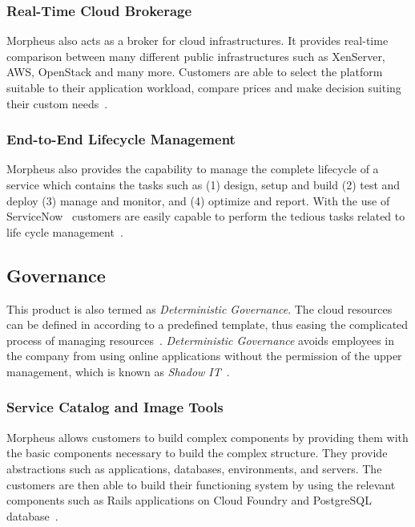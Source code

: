 \subsubsection{Real-Time Cloud Brokerage}

Morpheus also acts as a broker for cloud infrastructures. It provides real-time 
comparison between many different public infrastructures such as XenServer, 
AWS, OpenStack and many more. Customers are able to select the platform 
suitable to their application workload, compare prices and make decision 
suiting their custom needs~\cite{hid-sp18-416-www-morpheus-analytics}. 

\subsubsection{End-to-End Lifecycle Management}

Morpheus also provides the capability to manage the complete lifecycle of a 
service which contains the tasks such as (1) design, setup and build (2) test 
and deploy (3) manage and monitor, and (4) optimize and report. With the use of 
ServiceNow~\cite{hid-sp18-416-www-servicenow} customers are easily capable to 
perform the tedious tasks related to life cycle 
management~\cite{hid-sp18-416-www-morpheus-analytics}.

\subsection{Governance}

This product is also termed as \textit{Deterministic Governance}. The cloud 
resources can be defined in according to a predefined template, thus easing the 
complicated process of managing 
resources~\cite{hid-sp18-416-www-morpheus-product-guide}. \textit{Deterministic 
Governance} avoids employees in the company from using online applications 
without the permission of the upper management, which is known as 
\textit{Shadow IT}~\cite{hid-sp18-416-www-shadowit-wikipedia}.

\subsubsection{Service Catalog and Image Tools}

Morpheus allows customers to build complex components by providing them with 
the basic components necessary to build the complex structure. They provide 
abstractions such as applications, databases, environments, and servers. The 
customers are then able to build their functioning system by using the relevant 
components such as Rails applications on Cloud Foundry and PostgreSQL 
database~\cite{hid-sp18-416-www-morpheus-control}.

